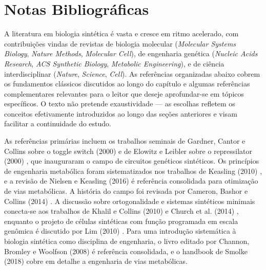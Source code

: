\section{Notas Bibliográficas}
\label{sec:14-bibliografia}

{A literatura em biologia sintética é vasta e cresce em ritmo acelerado, com contribuições vindas de revistas de biologia molecular (\textit{Molecular Systems Biology}, \textit{Nature Methods}, \textit{Molecular Cell}), de engenharia genética (\textit{Nucleic Acids Research}, \textit{ACS Synthetic Biology}, \textit{Metabolic Engineering}), e de ciência interdisciplinar (\textit{Nature}, \textit{Science}, \textit{Cell}). As referências organizadas abaixo cobrem os fundamentos clássicos discutidos ao longo do capítulo e algumas referências complementares relevantes para o leitor que deseje aprofundar-se em tópicos específicos. O texto não pretende exaustividade --- as escolhas refletem os conceitos efetivamente introduzidos ao longo das seções anteriores e visam facilitar a continuidade do estudo.

As referências primárias incluem os trabalhos seminais de Gardner, Cantor e Collins sobre o toggle switch (2000) \cite{gardner2000} e de Elowitz e Leibler sobre o repressilator (2000) \cite{elowitz2000}, que inauguraram o campo de circuitos genéticos sintéticos. Os princípios de engenharia metabólica foram sistematizados nos trabalhos de Keasling (2010) \cite{keasling2010}, e a revisão de Nielsen e Keasling (2016) \cite{nielsen2016} é referência consolidada para otimização de vias metabólicas. A história do campo foi revisada por Cameron, Bashor e Collins (2014) \cite{cameron2014}. A discussão sobre ortogonalidade e sistemas sintéticos minimais conecta-se aos trabalhos de Khalil e Collins (2010) \cite{khalil2010} e Church et al. (2014) \cite{church2014}, enquanto o projeto de células sintéticas com função programada em escala genômica é discutido por Lim (2010) \cite{lim2010}. Para uma introdução sistemática à biologia sintética como disciplina de engenharia, o livro editado por Channon, Bromley e Woolfson (2008) \cite{channon2008} é referência consolidada, e o handbook de Smolke (2018) \cite{smolke2018} cobre em detalhe a engenharia de vias metabólicas.

}

